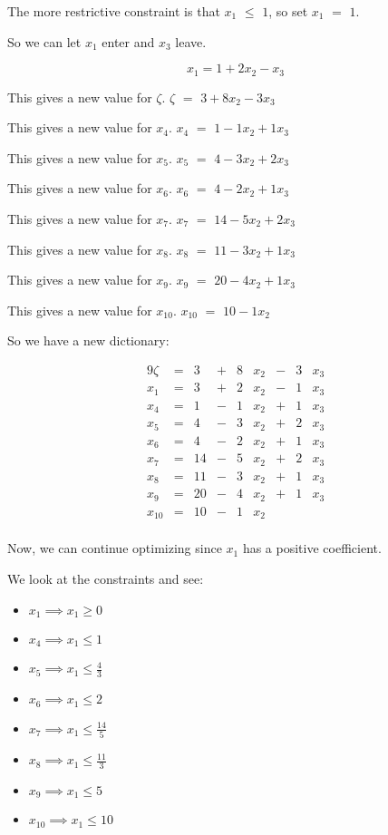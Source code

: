 \documentclass[12pt,letterpaper]{article}
\newcommand*\seeconstraints{
  We look at the constraints and see:
}
\newcommand*\continueopt[1]{
  Now, we can continue optimizing since #1 has a positive coefficient.
}
\newcommand*\enterleave[2]{
  So we can let #1 enter and #2 leave.
}
\newcommand*\morerestrictive[2]{
  The more restrictive constraint is that #1 $\leq$ #2, so set #1 $=$ #2.
}
\newcommand*\newdict{
  So we have a new dictionary:
}
\newcommand*\newvalue[2]{
  This gives a new value for #1. #1 $ = $ #2
}
\begin{document}
\begin{enumerate}
      \morerestrictive{$x_1$}{$1$}

      \enterleave{$x_1$}{$x_3$}

      \[
        x_1 = 1 + 2 x_2 - x_3
      \]

      \newvalue{$\zeta$}{$3 + 8 x_2 - 3 x_3$}

      \newvalue{$x_4$}{$1  - 1 x_2 + 1 x_3$}

      \newvalue{$x_5$}{$4  - 3 x_2 + 2 x_3$}

      \newvalue{$x_6$}{$4  - 2 x_2 + 1 x_3$}

      \newvalue{$x_7$}{$14 - 5 x_2 + 2 x_3$}

      \newvalue{$x_8$}{$11 - 3 x_2 + 1 x_3$}

      \newvalue{$x_9$}{$20 - 4 x_2 + 1 x_3$}

      \newvalue{$x_{10}$}{$10 - 1 x_2$}

      \newdict

      \begin{alignat*}{9}
        \zeta  & {}={} & 3  & {}+{} & 8 & x_2 & {}-{} & 3 & x_3 \\
        x_1    & {}={} & 3  & {}+{} & 2 & x_2 & {}-{} & 1 & x_3 \\
        x_4    & {}={} & 1  & {}-{} & 1 & x_2 & {}+{} & 1 & x_3 \\
        x_5    & {}={} & 4  & {}-{} & 3 & x_2 & {}+{} & 2 & x_3 \\
        x_6    & {}={} & 4  & {}-{} & 2 & x_2 & {}+{} & 1 & x_3 \\
        x_7    & {}={} & 14 & {}-{} & 5 & x_2 & {}+{} & 2 & x_3 \\
        x_8    & {}={} & 11 & {}-{} & 3 & x_2 & {}+{} & 1 & x_3 \\
        x_9    & {}={} & 20 & {}-{} & 4 & x_2 & {}+{} & 1 & x_3 \\
        x_{10} & {}={} & 10 & {}-{} & 1 & x_2 &       &   &     \\
      \end{alignat*}

      \continueopt{$x_1$}

      \seeconstraints

      \begin{itemize}
        \item $x_1    \implies x_1 \geq 0$
        \item $x_4    \implies x_1 \leq 1$
        \item $x_5    \implies x_1 \leq \frac{4}{3}$
        \item $x_6    \implies x_1 \leq 2$
        \item $x_7    \implies x_1 \leq \frac{14}{5}$
        \item $x_8    \implies x_1 \leq \frac{11}{3}$
        \item $x_9    \implies x_1 \leq 5$
        \item $x_{10} \implies x_1 \leq 10$
      \end{itemize}


\end{enumerate}
\end{document}
